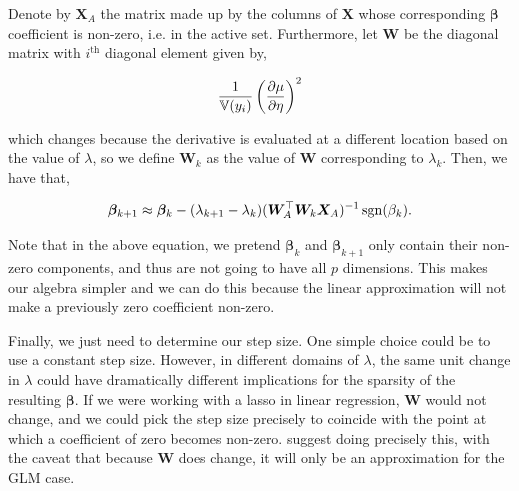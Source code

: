 \documentclass[letterpaper, 12pt]{article}
\newcommand{\bX}{\bm X}
\newcommand{\bW}{\bm W}
\newcommand{\bbeta}{\bm \beta}
\begin{document}
Denote by $\bX_A$ the matrix made up by the columns of $\bX$ whose corresponding
$\bbeta$ coefficient is non-zero, i.e. in the active set. Furthermore, let $\bW$
be the diagonal matrix with $i^\text{th}$ diagonal element given by,

\[ \frac{1}{\mathbb{V}(y_i)} \left( \frac{\partial \mu}{\partial \eta} \right)^2\]

which changes because the derivative is evaluated at a different location based
on the value of $\lambda$, so we define $\bW_k$ as the value of $\bW$
corresponding to $\lambda_k$. Then, we have that,

\[ \bbeta_{k+1} \approx \bbeta_k - (\lambda_{k+1} - \lambda_k) (\bW_A^\top \bW_k
\bX_A)^{-1} \sgn (\beta_k).\]

Note that in the above equation, we pretend $\bbeta_k$ and $\bbeta_{k+1}$ only
contain their non-zero components, and thus are not going to have all $p$
dimensions. This makes our algebra simpler and we can do this because the linear
approximation will not make a previously zero coefficient non-zero.

Finally, we just need to determine our step size. One simple choice could be to
use a constant step size. However, in different domains of $\lambda$, the same
unit change in $\lambda$ could have dramatically different implications for the
sparsity of the resulting $\bbeta$. If we were working with a lasso in linear
regression, $\bW$ would not change, and we could pick the step size precisely to
coincide with the point at which a coefficient of zero becomes non-zero.
\cite{park2007l1} suggest doing precisely this, with the caveat that because
$\bW$ does change, it will only be an approximation for the GLM case. 
\end{document}
